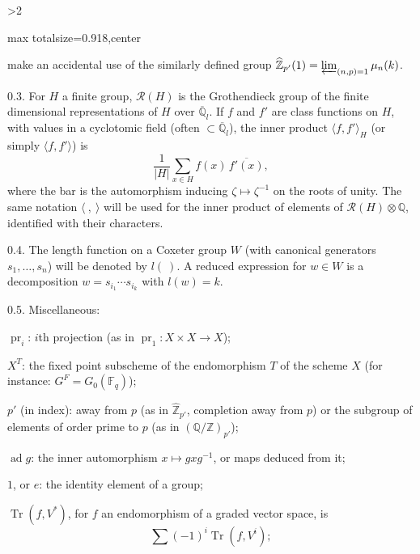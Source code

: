\documentclass[9pt,twoside]{extarticle}
\newcommand{\EditionPage}[3]{%
  \ifnum#1>2\clearpage\fi
  \pdfbookmark[1]{Printed page #2}{en-folio-#2}%
  \hypertarget{en-physical-#1}{}%
  \noindent\begin{adjustbox}{max totalsize={\textwidth}{0.918\textheight},center}
  \begin{minipage}[t]{\textwidth}
  \fontsize{9.4}{11.1}\selectfont\justifying
  #3
  \end{minipage}
  \end{adjustbox}%
}
\begin{document}
\EditionPage{4}{105}{%
make an accidental use of the similarly defined group \(\widehat{\mathbb{Z}}_{p'}(1)=\varprojlim_{(n,p)=1}\mu_n(k)\).\par

0.3. For \(H\) a finite group, \(\mathcal{R}(H)\) is the Grothendieck group of the finite dimensional representations of \(H\) over \(\overline{\mathbb{Q}}_l\). If \(f\) and \(f'\) are class functions on \(H\), with values in a cyclotomic field (often \(\subset\overline{\mathbb{Q}}_l\)), the inner product \(\langle f,f'\rangle_H\) (or simply \(\langle f,f'\rangle\)) is \[
\frac{1}{|H|}\sum_{x\in H} f(x)\,\overline{f'(x)},
\] where the bar is the automorphism inducing \(\zeta\mapsto\zeta^{-1}\) on the roots of unity. The same notation \(\langle\ ,\ \rangle\) will be used for the inner product of elements of \(\mathcal{R}(H)\otimes\mathbb{Q}\), identified with their characters.\par

0.4. The length function on a Coxeter group \(W\) (with canonical generators \(s_1,\ldots,s_n\)) will be denoted by \(l(\ )\). A reduced expression for \(w\in W\) is a decomposition \(w=s_{i_1}\cdots s_{i_k}\) with \(l(w)=k\).\par

0.5. Miscellaneous:\par

\(\operatorname{pr}_i\): \(i\)th projection (as in \(\operatorname{pr}_1:X\times X\to X\));\par

\(X^T\): the fixed point subscheme of the endomorphism \(T\) of the scheme \(X\) (for instance: \(G^F=G_0(\mathbb{F}_q)\));\par

\(p'\) (in index): away from \(p\) (as in \(\widehat{\mathbb{Z}}_{p'}\), completion away from \(p\)) or the subgroup of elements of order prime to \(p\) (as in \((\mathbb{Q}/\mathbb{Z})_{p'}\));\par

\(\operatorname{ad}g\): the inner automorphism \(x\mapsto gxg^{-1}\), or maps deduced from it;\par

\(1\), or \(e\): the identity element of a group;\par

\(\operatorname{Tr}(f,V^*)\), for \(f\) an endomorphism of a graded vector space, is \[
\sum(-1)^i\operatorname{Tr}(f,V^i);
\]\par

}
\end{document}
